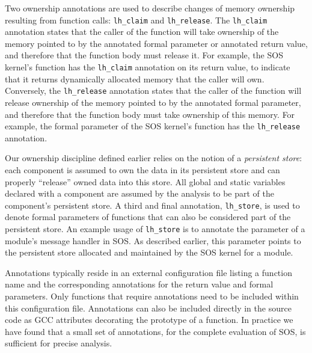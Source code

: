 Two ownership annotations are used to describe changes of memory ownership
resulting from function calls: {\tt lh\_claim} and {\tt lh\_release}.
%
The {\tt lh\_claim} annotation states that the caller of the function
will take ownership of the memory pointed to by the annotated formal
parameter or annotated return value, and therefore that the function
body must release it.
For example, the SOS kernel's
 function has the {\tt lh\_claim} annotation on its
return value, to indicate that it returns dynamically allocated memory
that the caller will own.
%
Conversely, the {\tt lh\_release} annotation states that the caller of
the function will release ownership of 
the memory pointed to by the annotated formal parameter,
and therefore that the function body must take ownership of this memory.
For example, the formal parameter of the SOS kernel's 
function has the {\tt lh\_release} annotation.
%

Our ownership discipline defined earlier relies 
on the notion of a {\em persistent
store}:  each component is assumed to own the data in its persistent
store and can properly ``release'' owned data into this store.
%
All global and static variables declared with a component 
are assumed by the analysis to be part
of the component's persistent store.
%
A third and final annotation, {\tt lh\_store}, is used to denote formal
parameters of functions that can also be considered part of the
persistent store.
%
An example usage of {\tt lh\_store} is to annotate 
the  parameter of a
module's message handler in SOS.
%
As described earlier, 
this parameter points to the persistent store allocated and
maintained by the SOS kernel for a module.


Annotations typically reside in an external configuration file listing
a function name and the corresponding annotations for the return value
and formal parameters.
%
Only functions that require annotations need to be included within
this configuration file.
%
Annotations can also be included directly in the source code as GCC
attributes decorating the prototype of a function.
%
%
In practice we have found that a small set of annotations, \numannote for the
complete evaluation of SOS, is sufficient for precise
analysis. 

